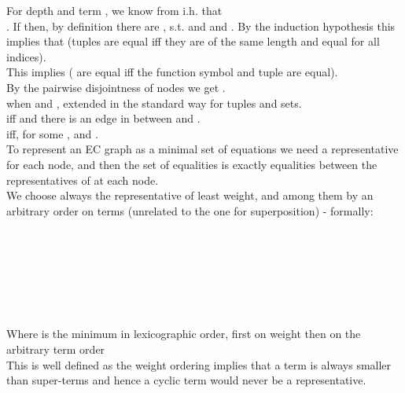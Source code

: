 For depth  and term , we know from i.h. that \\
.
If  then, by definition there are , s.t.  and
 and .
By the induction hypothesis this implies that  (tuples are equal iff they are of the same length and equal for all indices).\\
This implies  (\GFAECs{} are equal iff the function symbol and tuple are equal).\\
By the pairwise disjointness of nodes we get .\\
 when  and , extended in the standard way for tuples and sets.\\
 iff  and there is an edge in  between  and .\\
 iff, for some ,  and .\\
To represent an EC graph as a minimal set of equations we need a representative \GFAEC for each node, 
and then the set of equalities is exactly equalities between the representatives of \GFAECs at each node.\\
We choose always the representative of least weight, and among them by an arbitrary order on terms (unrelated to the one for superposition) - formally:\\
\\
\\
\\
\\
\\
 \\
\\
Where  is the minimum in lexicographic order, first on weight then on the arbitrary term order\\
This is well defined as the weight ordering implies that a term is always smaller than super-terms and hence a cyclic term would never be a representative.

